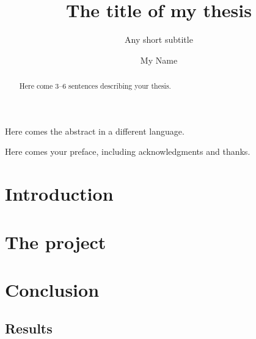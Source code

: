 \documentclass[UKenglish]{uiomasterthesis}  %
\title{The title of my thesis}        %
\subtitle{Any short subtitle}         %
\author{My Name}                      %
\begin{document}
\uiomasterfp[dept={Department of Physics},  %
    program={Physics},                        %
    supervisor={The Name},                    %
    long]                                     %

\frontmatter{}
\begin{abstract}
    Here come 3--6 sentences describing your thesis.
\end{abstract}

\begin{xabstract}[Sammendrag]               %
    Here comes the abstract in a different language.
\end{xabstract}

\tableofcontents{}                          %
\listoffigures{}                            %
\listoftables{}                             %

\begin{preface}
    Here comes your preface, including acknowledgments and thanks.
\end{preface}

\mainmatter{}
\part{Introduction}                   %



\part{The project}                    %




\part{Conclusion}                     %
\chapter{Results}                     %

\backmatter{}
\printbibliography{}
\end{document}
